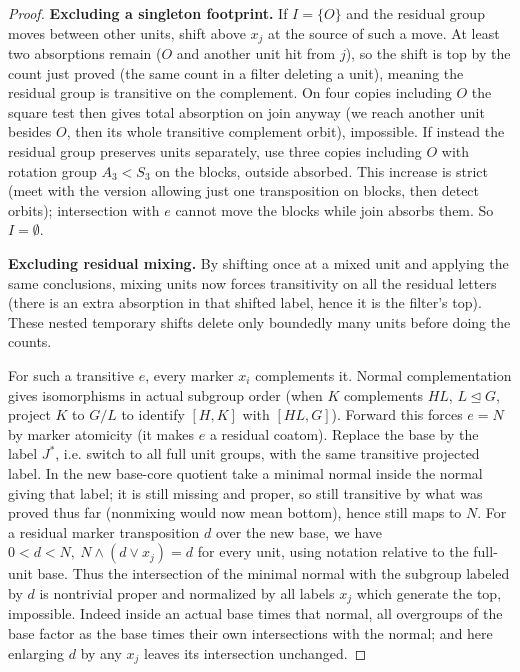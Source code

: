 \begin{proof}
\noindent\textbf{Excluding a singleton footprint.}
If \(I=\{O\}\) and the residual group moves between other units, shift above \(x_j\) at the source
of such a move. At least two absorptions remain (\(O\) and another unit hit from \(j\)), so the
shift is top by the count just proved (the same count in a filter deleting a unit), meaning the
residual group is transitive on the complement. On four copies including \(O\) the square test
then gives total absorption on join anyway (we reach another unit besides \(O\), then its whole
transitive complement orbit), impossible. If instead the residual group preserves units
separately, use three copies including \(O\) with rotation group \(A_3<S_3\) on the blocks,
outside absorbed. This increase is strict (meet with the version allowing just one transposition
on blocks, then detect orbits); intersection with \(e\) cannot move the blocks while join absorbs
them. So \(I=\emptyset\).

\noindent\textbf{Excluding residual mixing.}
By shifting once at a mixed unit and applying the same conclusions,
mixing units now forces transitivity on all the residual letters (there is an extra absorption in
that shifted label, hence it is the filter's top). These nested temporary shifts delete only
boundedly many units before doing the counts.

For such a transitive \(e\), every marker \(x_i\) complements it. Normal complementation gives
isomorphisms in actual subgroup order (when \(K\) complements \(HL\), \(L\trianglelefteq G\),
project \(K\) to \(G/L\) to identify \([H,K]\) with \([HL,G]\)). Forward this forces \(e=N\) by
marker atomicity (it makes \(e\) a residual coatom). Replace the base by the label \(J^*\), i.e.
switch to all full unit groups, with the same transitive projected label. In the new base-core
quotient take a minimal normal inside the normal giving that label; it is still missing and
proper, so still transitive by what was proved thus far (nonmixing would now mean bottom), hence
still maps to \(N\). For a residual marker transposition \(d\) over the new base, we have
\(0<d<N,\ N\wedge(d\vee x_j)=d\) for every unit, using notation relative to the full-unit base.
Thus the intersection of the minimal normal with the subgroup labeled by \(d\) is nontrivial
proper and normalized by all labels \(x_j\) which generate the top, impossible. Indeed inside an
actual base times that normal, all overgroups of the base factor as the base times their own
intersections with the normal; and here enlarging \(d\) by any \(x_j\) leaves its intersection
unchanged.


\end{proof}
